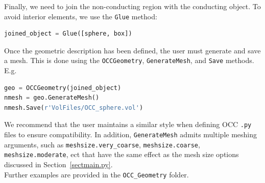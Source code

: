 \noindent
Finally, we need to join the non-conducting region with the conducting object. To avoid interior elements, we use the \texttt{𝙶𝚕𝚞𝚎} method:
\begin{lstlisting}[language=Python]
joined_object = Glue([sphere, box])
\end{lstlisting}
Once the geometric description has been defined, the user must generate and save a mesh. This is done using the \texttt{OCCGeometry}, \texttt{GenerateMesh}, and \texttt{Save} methods. E.g.
\begin{lstlisting}[language=Python]
geo = OCCGeometry(joined_object)
nmesh = geo.GenerateMesh()
nmesh.Save(r'VolFiles/OCC_sphere.vol')
\end{lstlisting}
We recommend that the user maintains a similar style when defining OCC \texttt{.py} files to ensure compatibility. In addition, \texttt{GenerateMesh} admits multiple meshing arguments, such as \texttt{meshsize.very\_coarse}, \texttt{meshsize.coarse}, \texttt{meshsize.moderate}, ect that have the same effect as the mesh size options discussed in Section~\ref{sectmain.py}.\\

\noindent
Further examples are provided in the \texttt{OCC\_Geometry} folder.

